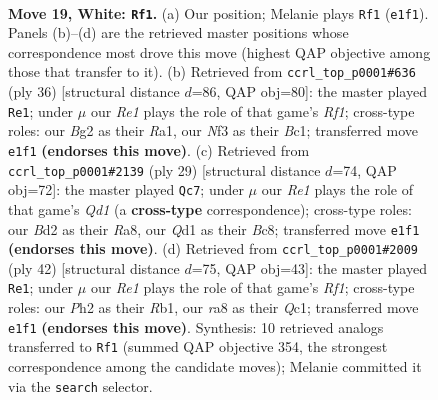 \documentclass[11pt]{article}
\begin{document}
\clearpage

\begin{figure}[p]\centering
\begin{subfigure}{0.46\textwidth}\centering
\resizebox{\linewidth}{!}{%
\newchessgame
\chessboard[
  setfen={r1b1k1r1/2p1qp2/2n2np1/3p3p/p2P4/P4NP1/3BPPBP/R2QR1K1 w q - 6 19},
  showmover=false,
  pgfstyle=straightmove, color=movearrow, markmove={e1-f1}
]}
\caption{}
\end{subfigure}\hfill
\begin{subfigure}{0.46\textwidth}\centering
\resizebox{\linewidth}{!}{%
\newchessgame
\chessboard[
  setfen={1k1r1b1r/1pp1q1pb/p1n2p1p/P7/2BP4/2P1PN2/6PP/R1BQ1RK1 w - - 0 19},
  showmover=false,
  pgfstyle=straightmove, color=movearrow, markmove={f1-e1}
]}
\caption{}
\end{subfigure}
\\[4pt]
\begin{subfigure}{0.46\textwidth}\centering
\resizebox{\linewidth}{!}{%
\newchessgame
\chessboard[
  setfen={r1bq1rk1/1p3pp1/p4n1p/2bpNP2/8/2N2Q2/PPP3PP/1K1R1B1R b - - 2 15},
  showmover=false,
  pgfstyle=straightmove, color=movearrow, markmove={d8-c7}
]}
\caption{}
\end{subfigure}\hfill
\begin{subfigure}{0.46\textwidth}\centering
\resizebox{\linewidth}{!}{%
\newchessgame
\chessboard[
  setfen={r4rk1/p1q1npp1/b4n1p/2pp4/1P6/P1N2NP1/4PPBP/1RQ2RK1 w - - 1 22},
  showmover=false,
  pgfstyle=straightmove, color=movearrow, markmove={f1-e1}
]}
\caption{}
\end{subfigure}
\caption{\textbf{Move 19, White: \texttt{Rf1}.} (a) Our position; Melanie plays \texttt{Rf1} (\texttt{e1f1}). Panels (b)--(d) are the retrieved master positions whose correspondence most drove this move (highest QAP objective among those that transfer to it). (b) Retrieved from \texttt{ccrl\_top\_p0001\#636} (ply 36) [structural distance $d$=86, QAP obj=80]: the master played \texttt{Re1}; under $\mu$ our \emph{Re1} plays the role of that game's \emph{Rf1}; cross-type roles: our \emph{B}g2 as their \emph{R}a1, our \emph{N}f3 as their \emph{B}c1; transferred move \texttt{e1f1} \textbf{(endorses this move)}. (c) Retrieved from \texttt{ccrl\_top\_p0001\#2139} (ply 29) [structural distance $d$=74, QAP obj=72]: the master played \texttt{Qc7}; under $\mu$ our \emph{Re1} plays the role of that game's \emph{Qd1} (a \textbf{cross-type} correspondence); cross-type roles: our \emph{B}d2 as their \emph{R}a8, our \emph{Q}d1 as their \emph{B}c8; transferred move \texttt{e1f1} \textbf{(endorses this move)}. (d) Retrieved from \texttt{ccrl\_top\_p0001\#2009} (ply 42) [structural distance $d$=75, QAP obj=43]: the master played \texttt{Re1}; under $\mu$ our \emph{Re1} plays the role of that game's \emph{Rf1}; cross-type roles: our \emph{P}h2 as their \emph{R}b1, our \emph{r}a8 as their \emph{Q}c1; transferred move \texttt{e1f1} \textbf{(endorses this move)}. Synthesis: 10 retrieved analogs transferred to \texttt{Rf1} (summed QAP objective 354, the strongest correspondence among the candidate moves); Melanie committed it via the \texttt{search} selector.}
\label{fig:thought-m36}
\end{figure}
\end{document}
